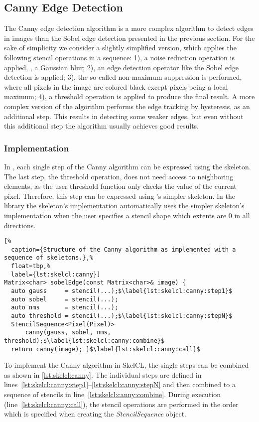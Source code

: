 \subsection{Canny Edge Detection}
The Canny edge detection algorithm is a more complex algorithm to detect edges in images than the Sobel edge detection presented in the previous section.
For the sake of simplicity we consider a slightly simplified version, which applies the following stencil operations in a sequence:
1), a noise reduction operation is applied, \eg, a Gaussian blur;
2), an edge detection operator like the Sobel edge detection is applied;
3), the so-called non-maximum suppression is performed, where all pixels in the image are colored black except pixels being a local maximum;
4), a threshold operation is applied to produce the final result.
A more complex version of the algorithm performs the edge tracking by hysteresis, as an additional step.
This results in detecting some weaker edges, but even without this additional step the algorithm usually achieves good results.


\subsubsection*{\SkelCL Implementation}
In \SkelCL, each single step of the Canny algorithm can be expressed using the \stencil skeleton.
The last step, the threshold operation, does not need access to neighboring elements, as the user threshold function only checks the value of the current pixel.
Therefore, this step can be expressed using \SkelCL's simpler \map skeleton.
In the \SkelCL library the  skeleton's implementation automatically uses the simpler \map skeleton's implementation when the user specifies a stencil shape which extents are $0$ in all directions.

\begin{lstlisting}[%
  caption={Structure of the Canny algorithm as implemented with a sequence of skeletons.},%
  float=tbp,%
  label={lst:skelcl:canny}]
Matrix<char> sobelEdge(const Matrix<char>& image) {
  auto gauss     = stencil(...);$\label{lst:skelcl:canny:step1}$
  auto sobel     = stencil(...);
  auto nms       = stencil(...);
  auto threshold = stencil(...);$\label{lst:skelcl:canny:stepN}$
  StencilSequence<Pixel(Pixel)>
      canny(gauss, sobel, nms, threshold);$\label{lst:skelcl:canny:combine}$
  return canny(image); }$\label{lst:skelcl:canny:call}$
\end{lstlisting}

To implement the Canny algorithm in SkelCL, the single steps can be combined as shown in \autoref{lst:skelcl:canny}.
The individual steps are defined in lines~\ref{lst:skelcl:canny:step1}--\ref{lst:skelcl:canny:stepN} and then combined to a sequence of stencils in line~\ref{lst:skelcl:canny:combine}.
During execution (line~\ref{lst:skelcl:canny:call}), the stencil operations are performed in the order which is specified when creating the \emph{StencilSequence} object.


